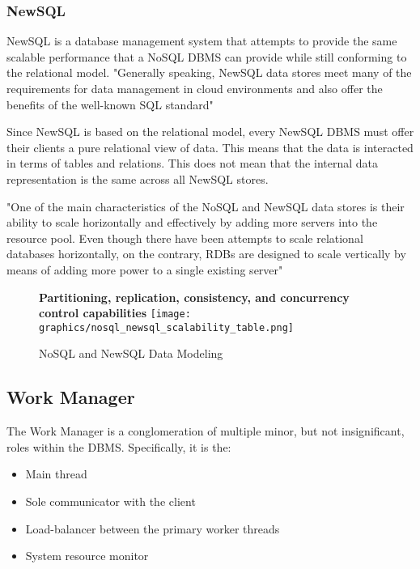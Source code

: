 \documentclass[letterpaper, 12pt]{article}
\begin{document}
\subsubsection{NewSQL}
NewSQL is a database management system that attempts to provide
the same scalable performance that a NoSQL DBMS can provide while still conforming to
the relational model. "Generally speaking, NewSQL data stores meet many of the
requirements for data management in cloud environments and also offer the benefits of
the well-known SQL standard"\cite{grolinger2013data}
\par\vspace{\baselineskip}
Since NewSQL is based on the relational model, every NewSQL DBMS must offer their clients
a pure relational view of data. This means that the data is interacted in terms of tables
and relations. This does not mean that the internal data representation is the same across
all NewSQL stores.
\par\vspace{\baselineskip}
"One of the main characteristics of the NoSQL and NewSQL data stores is their ability to
scale horizontally and effectively by adding more servers into the resource pool. Even
though there have been attempts to scale relational databases horizontally, on the contrary,
RDBs are designed to scale vertically by means of adding more power to a single existing
server"\cite{grolinger2013data}

\begin{figure}
  \centering
  \textbf{Partitioning, replication, consistency, and concurrency control capabilities}
  \texttt{[image: graphics/nosql\_newsql\_scalability\_table.png]}
  \caption{NoSQL and NewSQL Data Modeling}
\end{figure}

\newpage

\subsection{Work Manager}
The Work Manager is a conglomeration of multiple minor, but not insignificant, roles
within the DBMS. Specifically, it is the:
\begin{itemize}
  \item Main thread
  \item Sole communicator with the client
  \item Load-balancer between the primary worker threads
  \item System resource monitor
\end{itemize}
\end{document}

